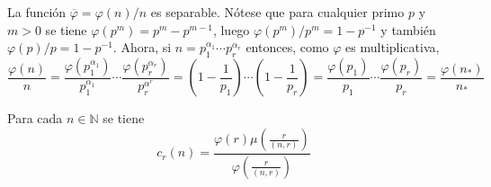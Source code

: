 \begin{example}
La función $\overline{\varphi}=\varphi(n)/n$ es separable. Nótese que para cualquier primo $p$ y $m>0$ se tiene $\varphi(p^m)=p^m-p^{m-1}$, luego $\varphi(p^m)/p^m=1-p^{-1}$ y también $\varphi(p)/p=1-p^{-1}$. Ahora, si $n=p_1^{\alpha_1} \cdots p_r^{\alpha_r}$ entonces, como $\varphi$ es multiplicativa,
\begin{equation*}
    \frac{\varphi(n)}{n} = \frac{\varphi(p_1^{\alpha_1})}{p_1^{\alpha_1}} \cdots \frac{\varphi(p_r^{\alpha_r})}{p_r^{\alpha^r}} = \left( 1-\frac{1}{p_1} \right) \cdots \left( 1-\frac{1}{p_r} \right) = \frac{\varphi(p_1)}{p_1} \cdots \frac{\varphi(p_r)}{p_r} = \frac{\varphi(n_*)}{n_*}
\end{equation*}
\end{example}

\begin{lemma}\label{lem:holder}
Para cada $n \in \mathbb{N}$ se tiene
\begin{equation*}
    c_r(n) = \frac{\varphi(r) \mu \left( \displaystyle \frac{r}{(n,r)} \right)}{\varphi \left( \displaystyle \frac{r}{(n,r)} \right)}
\end{equation*}
\end{lemma}

